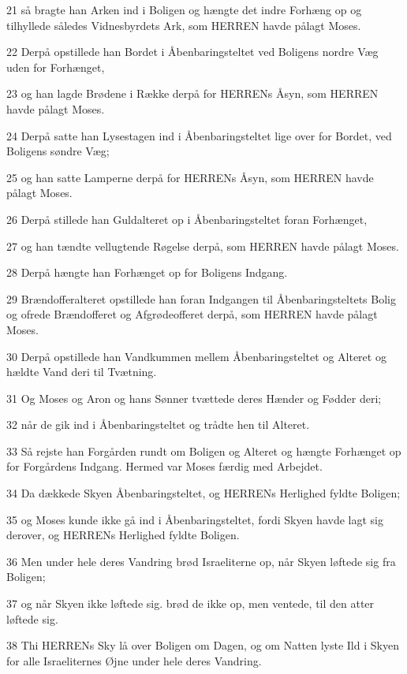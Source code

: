 \par 21 så bragte han Arken ind i Boligen og hængte det indre Forhæng op og tilhyllede således Vidnesbyrdets Ark, som HERREN havde pålagt Moses.
\par 22 Derpå opstillede han Bordet i Åbenbaringsteltet ved Boligens nordre Væg uden for Forhænget,
\par 23 og han lagde Brødene i Række derpå for HERRENs Åsyn, som HERREN havde pålagt Moses.
\par 24 Derpå satte han Lysestagen ind i Åbenbaringsteltet lige over for Bordet, ved Boligens søndre Væg;
\par 25 og han satte Lamperne derpå for HERRENs Åsyn, som HERREN havde pålagt Moses.
\par 26 Derpå stillede han Guldalteret op i Åbenbaringsteltet foran Forhænget,
\par 27 og han tændte vellugtende Røgelse derpå, som HERREN havde pålagt Moses.
\par 28 Derpå hængte han Forhænget op for Boligens Indgang.
\par 29 Brændofferalteret opstillede han foran Indgangen til Åbenbaringsteltets Bolig og ofrede Brændofferet og Afgrødeofferet derpå, som HERREN havde pålagt Moses.
\par 30 Derpå opstillede han Vandkummen mellem Åbenbaringsteltet og Alteret og hældte Vand deri til Tvætning.
\par 31 Og Moses og Aron og hans Sønner tvættede deres Hænder og Fødder deri;
\par 32 når de gik ind i Åbenbaringsteltet og trådte hen til Alteret.
\par 33 Så rejste han Forgården rundt om Boligen og Alteret og hængte Forhænget op for Forgårdens Indgang. Hermed var Moses færdig med Arbejdet.
\par 34 Da dækkede Skyen Åbenbaringsteltet, og HERRENs Herlighed fyldte Boligen;
\par 35 og Moses kunde ikke gå ind i Åbenbaringsteltet, fordi Skyen havde lagt sig derover, og HERRENs Herlighed fyldte Boligen.
\par 36 Men under hele deres Vandring brød Israeliterne op, når Skyen løftede sig fra Boligen;
\par 37 og når Skyen ikke løftede sig. brød de ikke op, men ventede, til den atter løftede sig.
\par 38 Thi HERRENs Sky lå over Boligen om Dagen, og om Natten lyste Ild i Skyen for alle Israeliternes Øjne under hele deres Vandring.


